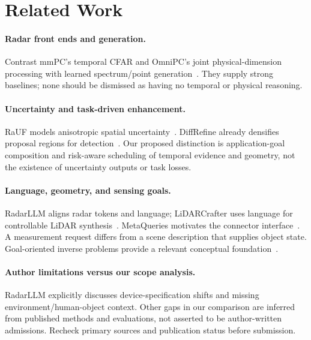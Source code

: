 \section{Related Work}
\label{sec:related}
\paragraph{Radar front ends and generation.}
Contrast mmPC's temporal CFAR and OmniPC's joint physical-dimension processing with learned spectrum/point generation~\cite{mmpc2025,omnipc2026,rald2026,mmwaveflow2026}. They supply strong baselines; none should be dismissed as having no temporal or physical reasoning.

\paragraph{Uncertainty and task-driven enhancement.}
RaUF models anisotropic spatial uncertainty~\cite{rauf2026}. DiffRefine already densifies proposal regions for detection~\cite{diffrefine2025}. Our proposed distinction is application-goal composition and risk-aware scheduling of temporal evidence and geometry, not the existence of uncertainty outputs or task losses.

\paragraph{Language, geometry, and sensing goals.}
RadarLLM aligns radar tokens and language; LiDARCrafter uses language for controllable LiDAR synthesis~\cite{radarllm2026,lidarcrafter2026}. MetaQueries motivates the connector interface~\cite{metaqueries2025}. A measurement request differs from a scene description that supplies object state. Goal-oriented inverse problems provide a relevant conceptual foundation~\cite{goalved2023}.

\paragraph{Author limitations versus our scope analysis.}
RadarLLM explicitly discusses device-specification shifts and missing environment/human-object context. Other gaps in our comparison are inferred from published methods and evaluations, not asserted to be author-written admissions. Recheck primary sources and publication status before submission.
